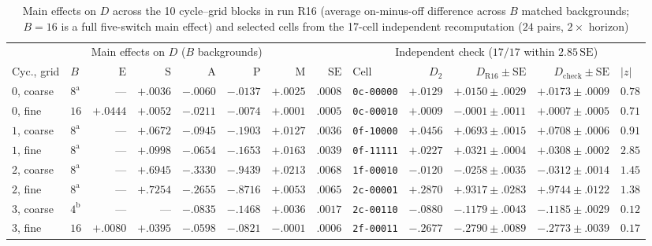 \begin{table}[htbp]\centering\scriptsize
\setlength{\tabcolsep}{2.2pt}
\caption{Main effects on $D$ across the 10 cycle--grid blocks in run R16 (average on-minus-off difference across $B$ matched backgrounds; $B = 16$ is a full five-switch main effect) and selected cells from the 17-cell independent recomputation ($24$ pairs, $2\times$ horizon)}\label{num-esm-tab-r16-main}\label{num-esm-tab-r16-check}
\begin{tabular}{llrrrrrr|lrrrl}\toprule
\multicolumn{8}{c|}{Main effects on $D$ ($B$ backgrounds)} & \multicolumn{5}{c}{Independent check ($17/17$ within $2.85\,\mathrm{SE}$)}\\
Cyc., grid & $B$ & $\mathrm{E}$ & $\mathrm{S}$ & $\mathrm{A}$ & $\mathrm{P}$ & $\mathrm{M}$ & $\mathrm{SE}$ & Cell & $D_2$ & $D_{\mathrm{R16}} \pm \mathrm{SE}$ & $D_{\mathrm{check}} \pm \mathrm{SE}$ & $|z|$\\\midrule
$0$, coarse & $8^{\mathrm{a}}$ & --- & $+.0036$ & $-.0060$ & $-.0137$ & $+.0025$ & $.0008$ & \texttt{0c-00000} & $+.0129$ & $+.0150 \pm .0029$ & $+.0173 \pm .0009$ & $0.78$\\
$0$, fine & $16$ & $+.0444$ & $+.0052$ & $-.0211$ & $-.0074$ & $+.0001$ & $.0005$ & \texttt{0c-00010} & $+.0009$ & $-.0001 \pm .0011$ & $+.0007 \pm .0005$ & $0.71$\\
$1$, coarse & $8^{\mathrm{a}}$ & --- & $+.0672$ & $-.0945$ & $-.1903$ & $+.0127$ & $.0036$ & \texttt{0f-10000} & $+.0456$ & $+.0693 \pm .0015$ & $+.0708 \pm .0006$ & $0.91$\\
$1$, fine & $8^{\mathrm{a}}$ & --- & $+.0998$ & $-.0654$ & $-.1653$ & $+.0163$ & $.0039$ & \texttt{0f-11111} & $+.0227$ & $+.0321 \pm .0004$ & $+.0308 \pm .0002$ & $2.85$\\
$2$, coarse & $8^{\mathrm{a}}$ & --- & $+.6945$ & $-.3330$ & $-.9439$ & $+.0213$ & $.0068$ & \texttt{1f-00010} & $-.0120$ & $-.0258 \pm .0035$ & $-.0312 \pm .0014$ & $1.45$\\
$2$, fine & $8^{\mathrm{a}}$ & --- & $+.7254$ & $-.2655$ & $-.8716$ & $+.0053$ & $.0065$ & \texttt{2c-00001} & $+.2870$ & $+.9317 \pm .0283$ & $+.9744 \pm .0122$ & $1.38$\\
$3$, coarse & $4^{\mathrm{b}}$ & --- & --- & $-.0835$ & $-.1468$ & $+.0036$ & $.0017$ & \texttt{2c-00110} & $-.0880$ & $-.1179 \pm .0043$ & $-.1185 \pm .0029$ & $0.12$\\
$3$, fine & $16$ & $+.0080$ & $+.0395$ & $-.0598$ & $-.0821$ & $-.0001$ & $.0006$ & \texttt{2f-00011} & $-.2677$ & $-.2790 \pm .0089$ & $-.2773 \pm .0039$ & $0.17$\\

\end{tabular}
\end{table}

